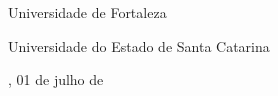 \begin{folhadeaprovacao}
	\begin{center}
		\vspace*{-1.25cm}
		 \par
		\vspace{0.15cm}
		Universidade de Fortaleza
		
		 \par
		\vspace{0.15cm}
		Universidade do Estado de Santa Catarina

	
	\end{center}
    
    \vspace*{\fill}  
    \begin{center}
    {\imprimirlocal, 01 de julho de \imprimirdata} %
	\end{center}
    \vspace*{0.25cm}  
\end{folhadeaprovacao}




%	
%	
%	
%	
